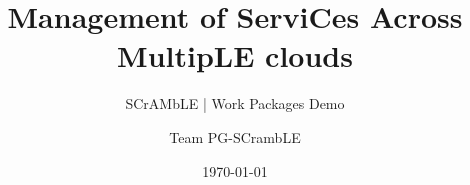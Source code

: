 \title{Management of ServiCes Across MultipLE clouds} 

\subtitle{SCrAMbLE | Work Packages Demo}

\author{Team PG-SCrambLE}


\date{\today} 

\newcommand{\upbcolor}{uni-blue} 

